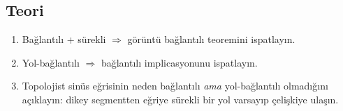 \subsection*{Teori}

\begin{enumerate}[label=T\arabic*.]
\item Bağlantılı + sürekli $\Rightarrow$ görüntü bağlantılı teoremini ispatlayın.
\item Yol-bağlantılı $\Rightarrow$ bağlantılı implicasyonunu ispatlayın.
\item Topolojist sinüs eğrisinin neden bağlantılı \emph{ama} yol-bağlantılı
      olmadığını açıklayın: dikey segmentten eğriye sürekli bir yol varsayıp
      çelişkiye ulaşın. 
\end{enumerate}
